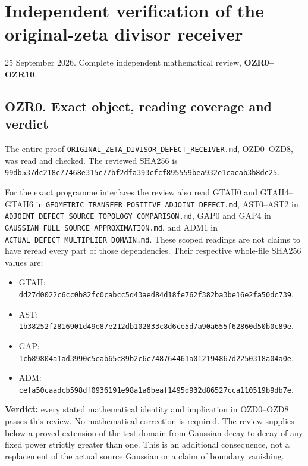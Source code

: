 \section{Independent verification of the original-zeta divisor
receiver}\label{independent-verification-of-the-original-zeta-divisor-receiver}

25 September 2026. Complete independent mathematical review,
\textbf{OZR0--OZR10}.

\subsection{OZR0. Exact object, reading coverage and
verdict}\label{ozr0.-exact-object-reading-coverage-and-verdict}

The entire proof \nolinkurl{ORIGINAL_ZETA_DIVISOR_DEFECT_RECEIVER.md},
OZD0--OZD8, was read and checked. The reviewed SHA256 is
\nolinkurl{99db537dc218c77468e315c77bf2dfa393cfcf895559bea932e1cacab3b8dc25}.

For the exact programme interfaces the review also read GTAH0 and
GTAH4--GTAH6 in
\nolinkurl{GEOMETRIC_TRANSFER_POSITIVE_ADJOINT_DEFECT.md}, AST0--AST2 in
\nolinkurl{ADJOINT_DEFECT_SOURCE_TOPOLOGY_COMPARISON.md}, GAP0 and GAP4
in \nolinkurl{GAUSSIAN_FULL_SOURCE_APPROXIMATION.md}, and ADM1 in
\nolinkurl{ACTUAL_DEFECT_MULTIPLIER_DOMAIN.md}. These scoped readings
are not claims to have reread every part of those dependencies. Their
respective whole-file SHA256 values are:

\begin{itemize}
\tightlist
\item
  GTAH:
  \nolinkurl{dd27d0022c6cc0b82fc0cabcc5d43aed84d18fe762f382ba3be16e2fa50dc739}.
\item
  AST:
  \nolinkurl{1b38252f2816901d49e87e212db102833c8d6ce5d7a90a655f62860d50b0c89e}.
\item
  GAP:
  \nolinkurl{1cb89804a1ad3990c5eab65c89b2c6c748764461a012194867d2250318a04a0e}.
\item
  ADM:
  \nolinkurl{cefa50caadcb598df0936191e98a1a6beaf1495d932d86527cca110519b9db7e}.
\end{itemize}

\textbf{Verdict:} every stated mathematical identity and implication in
OZD0--OZD8 passes this review. No mathematical correction is required.
The review supplies below a proved extension of the test domain from
Gaussian decay to decay of any fixed power strictly greater than one.
This is an additional consequence, not a replacement of the actual
source Gaussian or a claim of boundary vanishing.

